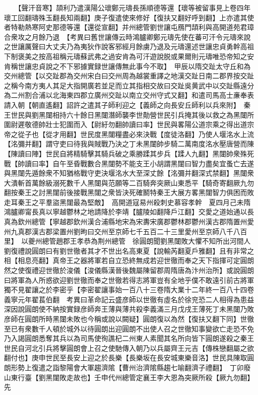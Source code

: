 　　【聲汗音寒】頡利乃遣漢陽公瓌鄭元璹長孫順德等還【瓌等被留事見上卷四年瓌工回翻璹殊玉翻長知兩翻】庚子復遣使來修好【復扶又翻好呼到翻】上亦遣其使者特勒熱寒阿史那德等還【還從宣翻】并州總管劉世讓屯鴈門頡利與高開道苑君璋合衆攻之月餘乃退　【考異曰舊世讓傳云時鴻臚卿鄭元璹先使在蕃可汗令元璹來說之世讓厲聲曰大丈夫乃為夷狄作說客邪經月餘虜乃退及元璹還述世讓忠貞勇幹高祖下制褒美之按高祖稱元璹蘇武弗之過安肯為可汗遊說脱或果爾則元璹唯恐帝知之安肯稱世讓忠貞說之不下邪據實録世讓傳無此事今不取】　甲辰以隋交趾太守丘和為交州總管【以交趾郡為交州宋白曰交州周為越裳重譯之地漢交趾日南二郡界按交趾之稱今南方夷人其足大指開廣若並足而立其指相交故曰交趾吳黄武中以交趾縣遠分為二州割合浦以北海東四郡立廣州交趾以南立交州守式又翻】和遣司馬高士亷奉表請入朝【朝直遙翻】詔許之遣其子師利迎之【義師之向長安丘師利以兵來附】　秦王世民與劉黑闥相持六十餘日黑闥潛師襲李世勣營世民引兵掩其後以救之為黑闥所圍尉遲敬德帥壯士犯圍而入【尉紆勿翻帥讀曰率】世民與畧陽公道宗乘之得出道宗帝之從子也【從才用翻】世民度黑闥糧盡必來決戰【度徒洛翻】乃使人堰洺水上流【洺彌并翻】謂守吏曰待我與賊戰乃決之丁未黑闥帥步騎二萬南度洺水壓唐營而陳【陳讀曰陣】世民自將精騎擊其騎兵破之乘勝蹂其步兵【蹂人九翻】黑闥帥衆殊死戰【帥讀曰率】自午至昏戰數合黑闥勢不能支王小胡謂黑闥曰智力盡矣宜蚤亡去遂與黑闥先遁餘衆不知猶格戰守吏決堰洺水大至深丈餘【洺彌并翻深式禁翻】黑闥衆大潰斬首萬餘級溺死數千人黑闥與范願等二百騎奔突厥山東悉平【騎奇寄翻厥九勿翻按秦王之討黑闥前後接戰黑闥之衆皆決死確鬭特秦王大展方畧黑闥智力俱困而敗走耳秦王之平羣盜黑闥最為堅敵】　高開道寇易州殺刺史慕容孝幹　夏四月己未隋鴻臚卿甯長真以寧越鬱林之地請降於李靖【臚陵如翻降戶江翻】交愛之道始通以長真為欽州總管【寧越郡欽州漢合浦縣地宋為宋夀宋廣郡鬱林郡鬱州漢古郡隋置州愛州九真郡漢古郡梁置州劉昫曰交州至京師七千五百二十三里愛州至京師八千八百里】　以夔州總管趙郡王孝恭為荆州總管　徐圓朗聞劉黑闥敗大懼不知所出河間人劉復禮說圓朗曰有劉世徹者其才不世出名高東夏【說輸芮翻夏戶雅翻】且有非常之相【相息亮翻】真帝王之器將軍若自立恐終無成若迎世徹而奉之天下指揮可定圓朗然之使復禮迎世徹於浚儀【浚儀縣漢晉後魏屬陳留郡周隋唐為汴州治所】或說圓朗曰將軍為人所惑欲迎劉世徹而奉之世徹若得志將軍豈有全地乎僕不敢遠引前古將軍獨不見翟讓之於李密乎【李密翟讓事始一百八十三卷隋大業十二年終一百八十四卷義寧元年翟萇伯翻　考異曰革命記云盛彦師以世徹有虛名於徐兖恐二人相得為患益深因說圓朗使不納按實録彦師奔王薄與薄共殺李義滿三月戊戌王薄死丁未黑闥乃敗彦師在圓朗所時黑闥未敗也今稱或說以闕疑】圓朗復以為然【復扶又翻下同】世徹至已有衆數千人頓於城外以待圓朗出迎圓朗不出使人召之世徹知事變欲亡走恐不免乃入謁圓朗悉奪其兵以為司馬使徇譙杞二州東人素聞其名所向皆下圓朗遂殺之秦王世民自河北引兵將擊圓朗會上召之使馳傳入朝乃以兵屬齊王元吉【傳株戀翻屬之欲翻付也】庚申世民至長安上迎之於長樂【長樂坂在長安城東樂音洛】世民具陳取圓朗形勢上復遣之詣黎陽會大軍趨濟隂【曹州治濟隂縣趨七喻翻濟子禮翻】　丁卯廢山東行臺【劉黑闥敗走故也】壬申代州總管定襄王李大恩為突厥所殺【厥九勿翻】先


